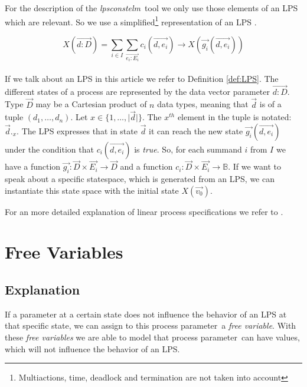 \index{}\documentclass[a4paper,10pt]{article}
\theoremstyle{plain}
\theoremstyle{definition}
\newcommand{\lps}{linear process specification}
\newcommand{\tool}{\textit{lpsconstelm}}
\newcommand{\ovr}{\overrightarrow}
\newcommand{\pp}{process parameter}
\newcommand{\ti}{\textit}
\begin{document}
\noindent For the description of the \tool\ tool we only use those elements of an LPS which are relevant. So we use a simplified\footnote{Multiactions, time, deadlock and termination are not taken into account} representation of an LPS .
\begin{defn}\label{def:LPS}
\begin{displaymath}
X (\ovr{d:D}) = \sum_{i \in I} \sum_{\ovr{e_i:E_i}} c_i ( \ovr{d, e_i}) \rightarrow X(\ovr{g_i}(\ovr{d,e_i}))
\end{displaymath}\\
If we talk about an LPS in this article we refer to Definition \ref{def:LPS}.  The different states
of a process are represented by the data vector parameter $\ovr{d: D}$. Type $\ovr{D}$ may be a Cartesian product of $n$ data types, meaning that $\ovr{d}$ is of a tuple $(d_1, \ldots, d_n)$.
Let $x \in \lbrace 1, \ldots , \vert \ovr{d} \vert \rbrace$. The $x^{th}$ element in the tuple is notated: $\ovr{d}._x$.
The LPS expresses that in state $\ovr{d}$ %
it can reach the new state $\ovr{g_i}(\ovr{d,e_i})$ under the condition that $c_i(\ovr{d,e_i})$ is \ti{true}. So, for each summand $i$ from $I$ we have a function $\ovr{g_i}: \ovr{D} \times \ovr{E_i} \rightarrow \ovr{D}$ and a function $c_i: \ovr{D} \times \ovr{E_i} \rightarrow \mathbb{B}$.
If we want to speak about a specific statespace, which is generated from an LPS, we can instantiate this state space with the initial state $X(\ovr{v_0})$.

\noindent For an more detailed explanation of \lps s  we refer to \cite{LPS_info}.
\end{defn}

\section{Free Variables}
\subsection{Explanation}

If a parameter at a certain state does not influence the behavior of an LPS at that specific state, we can assign to this \pp\ a \ti{free variable}. With these \ti{free variables} we are able to model that \pp\ can have values, which will not influence the behavior of an LPS.
\end{document}
